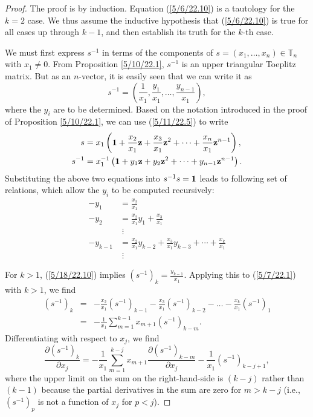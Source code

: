 \documentclass{amsart}
\theoremstyle{definition}
\numberwithin{theorem}{section}
\numberwithin{equation}{section}
\begin{document}
\begin{proof} The proof is by induction. Equation (\ref{5/6/22.10}) is a tautology for the $k=2$ case.  We thus assume the inductive hypothesis that (\ref{5/6/22.10}) is true  for all cases up through $k-1$, and then establish its truth for the $k$-th case.


We must first express $s^{-1}$ in terms of the components of  $s=(x_1,\dots,x_n)\in \mathbb{T}_n$ with $x_1\ne 0$.   From Proposition \ref{5/10/22.1},  $s^{-1}$ is an upper triangular Toeplitz matrix.  But as an $n$-vector, it is easily seen that we can write it as  \begin{equation}\label{5/9/22.1} s^{-1} = (\frac{1}{x_1}, \frac{y_1}{x_1},\dots, \frac{y_{n-1}}{x_1}),\end{equation} where the $y_i$ are to be determined. 
Based on the notation introduced in the proof of Proposition \ref{5/10/22.1}, we can use (\ref{5/11/22.5}) to write 
\begin{align}\nonumber s &= x_1 \left({\bf 1} + \frac{x_2}{x_1} {\bf z} + \frac{x_3}{x_1} {\bf z}^2 + \cdots + \frac{x_n}{x_1} {\bf z}^{n-1}\right), \\ s^{-1} &= x_1^{-1} \left({\bf 1} + y_1 {\bf z} + y_2 {\bf z}^2 + \cdots + y_{n-1} {\bf z}^{n-1}\right).  \label{5/18/22.10} \end{align}  Substituting the above two equations into $s^{-1} s = {\bf 1}$ leads to following set of relations, which allow the $y_i$ to be computed recursively:
\begin{align} -y_1 &= \frac{x_2}{x_1} \nonumber \\ -y_2 &= \frac{x_2}{x_1}y_1 + \frac{x_3}{x_1} \nonumber \\ &\;\vdots \nonumber \\ -y_{k-1} &= \frac{x_2}{x_1} y_{k-2} + \frac{x_3}{x_1} y_{k-3} + \cdots + \frac{x_k}{x_1} \label{5/7/22.1} \\ &\;\vdots \nonumber \end{align} 
 
 \noindent For $k>1$, (\ref{5/18/22.10}) implies  $\left( s^{-1} \right)_k = \frac{y_{k-1}}{x_1}$.  Applying this to (\ref{5/7/22.1}) with $k>1$, we find
\begin{eqnarray} \nonumber \left( s^{-1} \right)_k &=& -\frac{x_2}{x_1}\left( s^{-1} \right)_{k-1} - \frac{x_3}{x_1}\left( s^{-1} \right)_{k-2} -\dots  - \frac{x_k}{x_1}\left( s^{-1} \right)_1 \\ &=& -\frac{1}{x_1}\sum_{m=1}^{k-1} x_{m+1}\left( s^{-1} \right)_{k-m}. \label{5/7/22.2}\end{eqnarray}
Differentiating with respect to $x_j$, we find \begin{equation}  \frac{\partial \left( s^{-1} \right)_k}{\partial x_j} = -\frac{1}{x_1} \sum_{m=1}^{k-j} x_{m+1} \frac{\partial \left( s^{-1} \right)_{k-m}}{\partial x_j} -  \frac{1}{x_1}\left( s^{-1} \right)_{k-j+1} \label{5/7/22.4}, \end{equation} where the upper limit on the sum on the right-hand-side is $(k-j)$ rather than $(k-1)$ because the partial derivatives in the sum are zero for $m> k-j$ (i.e., $\left( s^{-1} \right)_p$ is not a function of $x_j$ for $p<j$).  


\end{proof}
\end{document}
